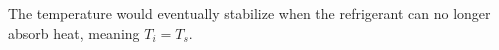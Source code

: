 The temperature would eventually stabilize when the refrigerant can no longer absorb heat, meaning \( T_i = T_s \).
